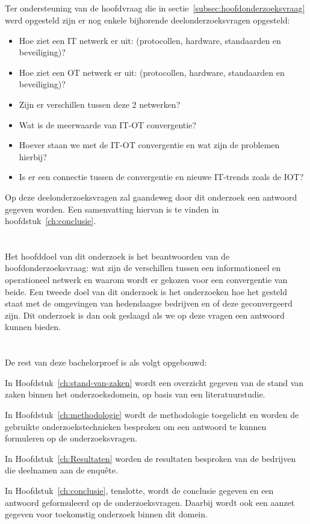 \subsection{}
\label{subsec:deelonderzoeksvraag}
Ter ondersteuning van de hoofdvraag die in sectie~\ref{subsec:hoofdonderzoeksvraag} werd opgesteld zijn er nog enkele bijhorende deelonderzoeksvragen opgesteld:
\begin{itemize}
    \item Hoe ziet een IT netwerk er uit: (protocollen, hardware, standaarden en beveiliging)?
    \item Hoe ziet een OT netwerk er uit: (protocollen, hardware, standaarden en beveiliging)?
    \item Zijn er verschillen tussen deze 2 netwerken?
    \item Wat is de meerwaarde van IT-OT convergentie?
    \item Hoever staan we met de IT-OT convergentie en wat zijn de problemen hierbij?  
    \item Is er een connectie tussen de convergentie en nieuwe IT-trends zoals de IOT?
    
\end{itemize} 
Op deze deelonderzoeksvragen zal gaandeweg door dit onderzoek een antwoord gegeven worden. Een samenvatting hiervan is te vinden in hoofdstuk~\ref{ch:conclusie}.
\section{}
\label{sec:onderzoeksdoelstelling}
Het hoofddoel van dit onderzoek is het beantwoorden van de hoofdonderzoeksvraag: wat zijn de  verschillen tussen een informationeel en operationeel netwerk en waarom wordt er gekozen voor een convergentie van beide. Een tweede doel van dit onderzoek is het onderzoeken hoe het gesteld staat met de omgevingen van hedendaagse bedrijven en of deze geconvergeerd zijn. Dit onderzoek is dan ook geslaagd als we op deze vragen een antwoord kunnen bieden.

\section{}
\label{sec:opzet-bachelorproef}
De rest van deze bachelorproef is als volgt opgebouwd:

In Hoofdstuk~\ref{ch:stand-van-zaken} wordt een overzicht gegeven van de stand van zaken binnen het onderzoeksdomein, op basis van een literatuurstudie.

In Hoofdstuk~\ref{ch:methodologie} wordt de methodologie toegelicht en worden de gebruikte onderzoekstechnieken besproken om een antwoord te kunnen formuleren op de onderzoeksvragen.

In Hoofdstuk~\ref{ch:Resultaten} worden de resultaten besproken van de bedrijven die deelnamen aan de enquête.

In Hoofdstuk~\ref{ch:conclusie}, tenslotte, wordt de conclusie gegeven en een antwoord geformuleerd op de onderzoeksvragen. Daarbij wordt ook een aanzet gegeven voor toekomstig onderzoek binnen dit domein.